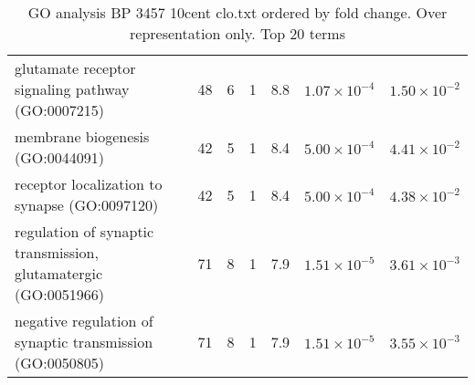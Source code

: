 \begin{table}[ht]
\begin{adjustbox}{width=\textwidth}
\begin{tabular}{lrrrrrr}
  glutamate receptor signaling pathway (GO:0007215) & 48 & 6 & 1 & 8.8 & $1.07 \times 10^{-4}$ & $1.50 \times 10^{-2}$ \\ 
  membrane biogenesis (GO:0044091) & 42 & 5 & 1 & 8.4 & $5.00 \times 10^{-4}$ & $4.41 \times 10^{-2}$ \\ 
  receptor localization to synapse (GO:0097120) & 42 & 5 & 1 & 8.4 & $5.00 \times 10^{-4}$ & $4.38 \times 10^{-2}$ \\ 
  regulation of synaptic transmission, glutamatergic (GO:0051966) & 71 & 8 & 1 & 7.9 & $1.51 \times 10^{-5}$ & $3.61 \times 10^{-3}$ \\ 
  negative regulation of synaptic transmission (GO:0050805) & 71 & 8 & 1 & 7.9 & $1.51 \times 10^{-5}$ & $3.55 \times 10^{-3}$ \\ 
   \hline
\end{tabular}
\end{adjustbox}
\caption{GO analysis BP 3457 10cent clo.txt ordered by fold change. Over representation only. Top 20 terms} 
\label{tab:GO analysis BP 3457 10cent clo.txt ordered by fold change. Over representation only. Top 20 terms}
\end{table}


